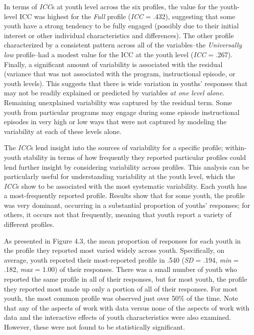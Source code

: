 \documentclass[]{msu-thesis}
\theoremstyle{definition}
\theoremstyle{definition}
\theoremstyle{definition}
\theoremstyle{remark}
\begin{document}
In terms of \emph{ICC}s at youth level across the six profiles, the
value for the youth-level ICC was highest for the \emph{Full} profile
(\emph{ICC} = .432), suggesting that some youth have a strong tendency
to be fully engaged (possibly due to their initial interest or other
individual characteristics and differences). The other profile
characterized by a consistent pattern across all of the variables--the
\emph{Universally low} profile--had a modest value for the ICC at the
youth level (\emph{ICC} = .267). Finally, a significant amount of
variability is associated with the residual (variance that was not
associated with the program, instructional episode, or youth levels).
This suggests that there is wide variation in youths' responses that may
not be readily explained or predicted by variables \emph{at one level
alone}. Remaining unexplained variability was captured by the residual
term. Some youth from particular programs may engage during some episode
instructional episodes in very high or low ways that were not captured
by modeling the variability at each of these levels alone.

The \emph{ICC}s lend insight into the sources of variability for a
specific profile; within-youth stability in terms of how frequently they
reported particular profiles could lend further insight by considering
variability across profiles. This analysis can be particularly useful
for understanding variability at the youth level, which the \emph{ICC}s
show to be associated with the most systematic variability. Each youth
has a most-frequently reported profile. Results show that for some
youth, the profile was very dominant, occurring in a substantial
proportion of youths' responses; for others, it occurs not that
frequently, meaning that youth report a variety of different profiles.

As presented in Figure 4.3, the mean proportion of responses for each
youth in the profile they reported most varied widely across youth.
Specifically, on average, youth reported their most-reported profile in
.540 (\emph{SD} = .194, \emph{min} = .182, \emph{max} = 1.00) of their
responses. There was a small number of youth who reported the same
profile in all of their responses, but for most youth, the profile they
reported most made up only a portion of all of their responses. For most
youth, the most common profile was observed just over 50\% of the time.
Note that any of the aspects of work with data versus none of the
aspects of work with data and the interactive effects of youth
characteristics were also examined. However, these were not found to be
statistically significant.
\end{document}
